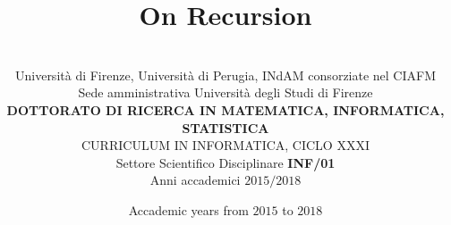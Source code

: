 
\newsavebox{\logounifi}
\newsavebox{\logounipg}
\newsavebox{\logoindam}

\title[On Recursion]{\setlength{\parindent}{0pt} On Recursion}

\author[Massimo Nocentini]{\usebox{\logounifi}\hfill\usebox{\logoindam}\hfill\usebox{\logounipg} \\
 \vspace{7mm}
 {\small Universit\`{a} di Firenze, Universit\`{a} di Perugia, INdAM  consorziate nel CIAFM}\\
 \vspace{-3mm}
 {\small Sede amministrativa Universit\`a degli Studi di Firenze}\\
 \vspace{5mm}
 {\small \textbf{DOTTORATO DI RICERCA IN MATEMATICA, INFORMATICA, STATISTICA}}\\
 \vspace{-3mm}
 {\small CURRICULUM IN INFORMATICA, CICLO XXXI}\\
 \vspace{5mm}
 {\small Settore Scientifico Disciplinare \textbf{INF/01}}\\
 \vspace{-3mm}
 {\small Anni accademici $2015/2018$}\\
 \vspace{-2cm}
 }

\date{Accademic years from $2015$ to $2018$}


